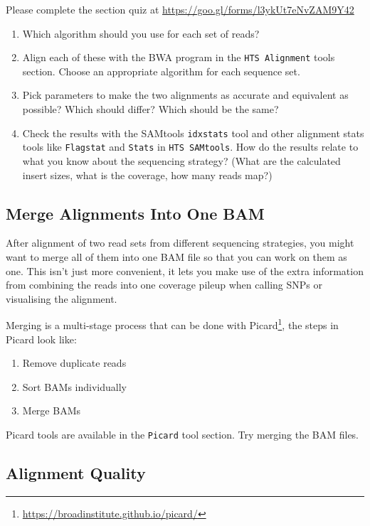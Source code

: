 \documentclass[12pt,]{book}
\providecommand{\tightlist}{%
  \setlength{\itemsep}{0pt}\setlength{\parskip}{0pt}}
\let\rmarkdownfootnote\footnote%
\def\footnote{\protect\rmarkdownfootnote}
\renewcommand{\href}[2]{#2\footnote{\url{#1}}}
\begin{document}
Please complete the section quiz at
\url{https://goo.gl/forms/l3ykUt7eNvZAM9Y42}

\begin{enumerate}
\def\labelenumi{\arabic{enumi}.}
\tightlist
\item
  Which algorithm should you use for each set of reads?
\item
  Align each of these with the BWA program in the
  \texttt{HTS\ Alignment} tools section. Choose an appropriate algorithm
  for each sequence set.
\item
  Pick parameters to make the two alignments as accurate and equivalent
  as possible? Which should differ? Which should be the same?
\item
  Check the results with the SAMtools \texttt{idxstats} tool and other
  alignment stats tools like \texttt{Flagstat} and \texttt{Stats} in
  \texttt{HTS\ SAMtools}. How do the results relate to what you know
  about the sequencing strategy? (What are the calculated insert sizes,
  what is the coverage, how many reads map?)
\end{enumerate}

\subsection{Merge Alignments Into One
BAM}\label{merge-alignments-into-one-bam}

After alignment of two read sets from different sequencing strategies,
you might want to merge all of them into one BAM file so that you can
work on them as one. This isn't just more convenient, it lets you make
use of the extra information from combining the reads into one coverage
pileup when calling SNPs or visualising the alignment.

Merging is a multi-stage process that can be done with
\href{https://broadinstitute.github.io/picard/}{Picard}, the steps in
Picard look like:

\begin{enumerate}
\def\labelenumi{\arabic{enumi}.}
\tightlist
\item
  Remove duplicate reads
\item
  Sort BAMs individually
\item
  Merge BAMs
\end{enumerate}

Picard tools are available in the \texttt{Picard} tool section. Try
merging the BAM files.

\subsection{Alignment Quality}\label{alignment-quality}
\end{document}
